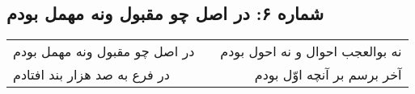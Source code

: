 \begin{center}
\section*{شماره ۶: در اصل چو مقبول ونه مهمل بودم}
\label{sec:006}
\begin{longtable}{l p{0.5cm} r}
در اصل چو مقبول ونه مهمل بودم
&&
نه بوالعجب احوال و نه احول بودم
\\
در فرع به صد هزار بند افتادم
&&
آخر برسم بر آنچه اوّل بودم
\\
\end{longtable}
\end{center}
